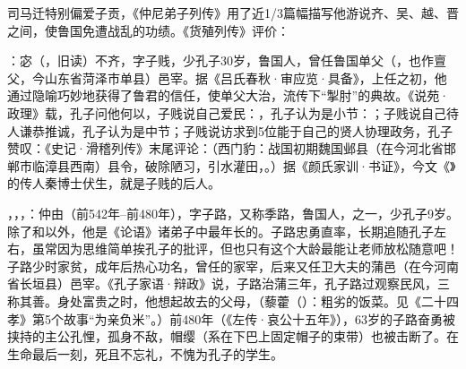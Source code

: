 司马迁特别偏爱子贡，《仲尼弟子列传》用了近1/3篇幅描写他游说齐、吴、越、晋之间，使鲁国免遭战乱的功绩。《货殖列传》评价：

：宓（，旧读）不齐，字子贱，少孔子30岁，鲁国人，曾任鲁国单父（，也作亶父，今山东省菏泽市单县）邑宰。据《吕氏春秋·审应览·具备》，上任之初，他通过隐喻巧妙地获得了鲁君的信任，使单父大治，流传下“掣肘”的典故。《说苑·政理》载，孔子问他何以，子贱说自己爱民：，孔子认为是小节：；子贱说自己待人谦恭推诚，孔子认为是中节；子贱说访求到5位能于自己的贤人协理政务，孔子赞叹：《史记·滑稽列传》末尾评论：（西门豹：战国初期魏国邺县（在今河北省邯郸市临漳县西南）县令，破除陋习，引水灌田，。）据《颜氏家训·书证》，今文《》的传人秦博士伏生，就是子贱的后人。%

，，，：仲由（前542年--前480年），字子路，又称季路，鲁国人，之一，少孔子9岁。除了和以外，他是《论语》诸弟子中最年长的。子路忠勇直率，长期追随孔子左右，虽常因为思维简单挨孔子的批评，但也只有这个大龄最能让老师放松随意吧！子路少时家贫，成年后热心功名，曾任的家宰，后来又任卫大夫的蒲邑（在今河南省长垣县）邑宰。《孔子家语·辩政》说，子路治蒲三年，孔子路过观察民风，三称其善。身处富贵之时，他想起故去的父母，（藜藿（）：粗劣的饭菜。见《二十四孝》第5个故事“为亲负米”。）前480年（《左传·哀公十五年》），63岁的子路奋勇被挟持的主公孔悝，孤身不敌，帽缨（系在下巴上固定帽子的束带）也被击断了。在生命最后一刻，死且不忘礼，不愧为孔子的学生。

